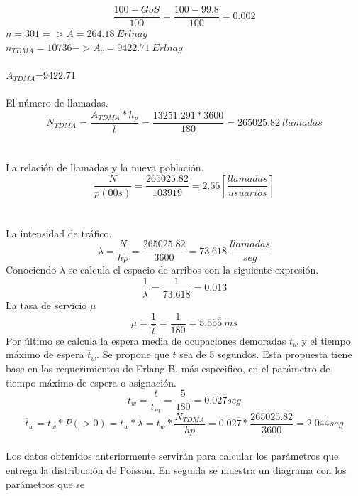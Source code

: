 \documentclass[11pt,letterpaper]{article}
\begin{document}
\newpage
\begin{equation}
    \frac{100-GoS}{100}=\frac{100-99.8}{100}=0.002
\end{equation}
$n=301 => A=264.18 \ Erlnag$
\\ 
$n_{TDMA}=10736->A_c=9422.71 \ Erlnag$
\\ \\
$A_{TDMA}$=9422.71
\\ \\
El número de llamadas.
\begin{equation}
    N_{TDMA}=\frac{A_{TDMA}*h_p}{\overline{t}}=\frac{13251.291*3600}{180}=265025.82 \ llamadas
\end{equation}
\\ \\
La relación de llamadas y la nueva población.
\begin{equation}
    \frac{N}{p(00s)}=\frac{265025.82}{103919}=2.55[\frac{llamadas}{usuarios}]
\end{equation}
\\ \\
La intensidad de tráfico.
\begin{equation}
    \lambda=\frac{N}{hp}=\frac{265025.82}{3600}=73.618 \ \frac{llamadas}{seg}
\end{equation}
Conociendo $\lambda$ se calcula el espacio de arribos con la siguiente expresión.
\begin{equation}
    \frac{1}{\lambda}=\frac{1}{73.618}=0.013 
\end{equation}
La tasa de servicio $\mu$
\begin{equation}
    \mu=\frac{1}{\overline{t}}=\frac{1}{180}=5.55\overline{5} \ ms
\end{equation}
Por último se calcula la espera media de ocupaciones demoradas $t_w$ y el tiempo máximo 
de espera $\overline{t}_w$. Se propone que $t$ sea de 5 segundos. Esta propuesta tiene base en los 
requerimientos de Erlang B, más especifico, en el parámetro de tiempo máximo de espera o 
asignación. 
\begin{equation}
    t_w=\frac{t}{t_m}=\frac{5}{180}=0.02\overline{7} seg
\end{equation}
\begin{equation}
    \overline{t}_w=t_w*P(>0)=t_w*\lambda=t_w*\frac{N_{TDMA}}{hp}=0.02\overline{7}*\frac{265025.82}{3600}=2.044seg
\end{equation}
\\
Los datos obtenidos anteriormente servirán para calcular los parámetros que entrega 
la distribución de Poisson. En seguida se muestra un diagrama con los parámetros que se 
\end{document}
